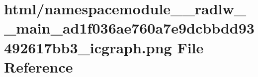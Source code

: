 \hypertarget{namespacemodule____radlw____main__ad1f036ae760a7e9dcbbdd93492617bb3__icgraph_8png}{}\section{html/namespacemodule\+\_\+\+\_\+radlw\+\_\+\+\_\+main\+\_\+ad1f036ae760a7e9dcbbdd93492617bb3\+\_\+icgraph.png File Reference}
\label{namespacemodule____radlw____main__ad1f036ae760a7e9dcbbdd93492617bb3__icgraph_8png}
